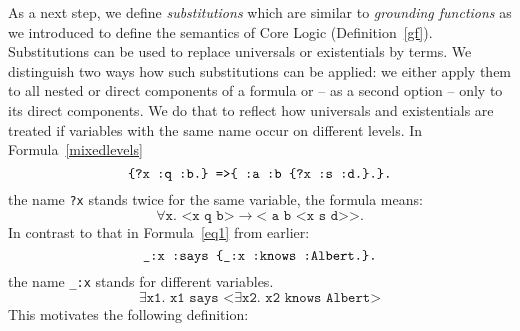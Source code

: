As a next step, we define \emph{substitutions} which are similar to \emph{grounding functions} as we introduced to define the semantics of \nthree Core Logic (Definition~\ref{gf}).
Substitutions can be used to replace universals or existentials by terms. We distinguish two ways how such substitutions can be applied: we either apply them to all nested or direct components 
of a formula or -- as a second option -- only to its direct components. 
We do that to reflect how universals and existentials are treated if variables with the same name occur on different levels. In Formula~\ref{mixedlevels} 
\begin{equation}\notag
 \texttt{\{?x :q :b.\} =>\{ :a :b \{?x :s :d.\}.\}.}
\end{equation}
the name \texttt{?x} stands twice for the same variable, the formula means: 
\[
 \forall \texttt{x. <x q b>}\rightarrow\texttt{< a b <x s d>{}>.}
\]
In contrast to that
% 
in Formula~\ref{eq1} from earlier: 
\[
 \verb!_:x :says {_:x :knows :Albert.}.!
\]
the name \texttt{\_:x} stands for different variables.
\[
 \exists \texttt{x1. x1 says <}\exists\texttt{x2. x2 knows Albert>} 
\]
This motivates the following definition:


